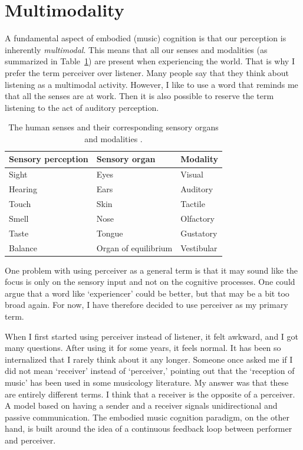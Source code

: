 \section{Multimodality}

A fundamental aspect of embodied (music) cognition is that our perception is inherently \emph{multimodal}. This means that all our senses and modalities (as summarized in Table~\ref{table:senses}) are present when experiencing the world. That is why I prefer the term perceiver over listener. Many people say that they think about listening as a multimodal activity. However, I like to use a word that reminds me that all the senses are at work. Then it is also possible to reserve the term listening to the act of auditory perception.

\begin{table}[tbp]
\begin{center}
\caption{The human senses and their corresponding sensory organs and modalities \citep[p.5]{schomaker_taxonomy_1995}.}
\label{table:senses}
\begin{tabular}{l|l|l}
Sensory perception  & Sensory organ & Modality 	\\
\hline
Sight         & Eyes		  & Visual 			\\
Hearing		    & Ears			& Auditory 		\\
Touch			    & Skin			& Tactile 		\\
Smell			    & Nose			& Olfactory 	\\
Taste			    & Tongue		& Gustatory 	\\
Balance		    & Organ of equilibrium 	& Vestibular 	\\
\end{tabular}
\end{center}
\end{table}

One problem with using perceiver as a general term is that it may sound like the focus is only on the sensory input and not on the cognitive processes. One could argue that a word like `experiencer' could be better, but that may be a bit too broad again. For now, I have therefore decided to use perceiver as my primary term.

When I first started using perceiver instead of listener, it felt awkward, and I got many questions. After using it for some years, it feels normal. It has been so internalized that I rarely think about it any longer. Someone once asked me if I did not mean `receiver' instead of `perceiver,' pointing out that the `reception of music' has been used in some musicology literature. My answer was that these are entirely different terms. I think that a receiver is the opposite of a perceiver. A model based on having a sender and a receiver signals unidirectional and passive communication. The embodied music cognition paradigm, on the other hand, is built around the idea of a continuous feedback loop between performer and perceiver.

